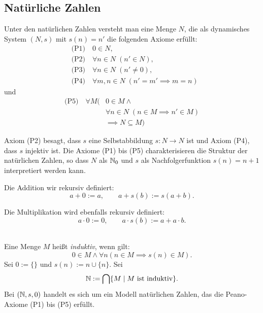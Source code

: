 \subsection{Natürliche Zahlen}
\begin{definition}\mbox{}\newline
Unter den natürlichen Zahlen versteht man eine Menge $N$, die
als dynamisches System $(N,s)$ mit $s(n)=n'$ die folgenden Axiome erfüllt:
\begin{align}
& \text{(P1)}\quad 0\in N,\\
& \text{(P2)}\quad \forall n{\in}N\;(n'\in N),\\
& \text{(P3)}\quad \forall n{\in}N\;(n'\ne 0),\\
& \text{(P4)}\quad \forall m,n{\in}N\;(n'=m'\implies m=n)
\end{align}
und
\begin{equation}
\begin{split}
\text{(P5)}\quad \forall M(&0\in M\land\\
& \forall n{\in}N\;(n\in M\implies n'\in M)\\
& \implies N\subseteq M)
\end{split}
\end{equation}
\end{definition}
Axiom (P2) besagt, dass $s$ eine Selbstabbildung $s\colon N\to N$
ist und Axiom (P4), dass $s$ injektiv ist. Die Axiome (P1) bis (P5)
charakterisieren die Struktur der natürlichen Zahlen, so dass
$N$ als $\mathbb N_0$ und $s$ als Nachfolgerfunktion $s(n)=n+1$ interpretiert
werden kann.

Die Addition wir rekursiv definiert:
\begin{equation}
a+0 := a,\qquad a+s(b) := s(a+b).
\end{equation}

Die Multiplikation wird ebenfalls rekursiv definiert:
\begin{equation}
a\cdot 0 := 0,\qquad a\cdot s(b):=a+a\cdot b.
\end{equation}

\noindent
{}\\
Eine Menge $M$ heißt \emph{induktiv}, wenn gilt:
\begin{equation}
0\in M\land \forall n(n\in M\implies s(n)\in M).
\end{equation}
Sei $0:=\{\}$ und $s(n):=n\cup\{n\}$. Sei
\begin{equation}
\mathbb N := \bigcap \{M\mid M\text{ ist induktiv}\}.
\end{equation}
Bei $(\mathbb N,s,0)$ handelt es sich um ein Modell
natürlichen Zahlen, das die Peano-Axiome (P1) bis (P5) erfüllt.

